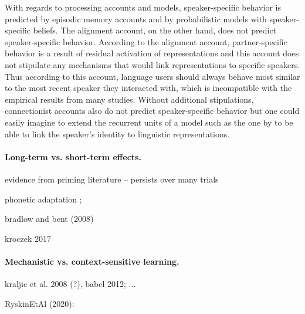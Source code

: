 With regards to processing accounts and models, speaker-specific behavior is predicted by episodic memory accounts and by probabilistic models with speaker-specific beliefs. 
The alignment account, on the other hand, does not predict speaker-specific behavior. According to the alignment account, partner-specific behavior is a result of residual activation of representations
and this account does not stipulate any mechanisms that would link representations to specific speakers. Thus according to this account, language users should always behave most similar to 
the most recent speaker they interacted with, which is incompatible with the empirical results from many studies. Without additional stipulations, connectionist accounts also do not 
predict speaker-specific behavior but one could easily imagine to extend the recurrent units of a model such as the one by \cite{Cheng2006} to be able to link the speaker's identity to
linguistic representations.

\paragraph{Long-term vs. short-term effects.} 

evidence from priming literature -- persists over many trials

phonetic adaptation \cite{XieEarleMyers2019}; 

bradlow and bent (2008)

kroczek 2017

\paragraph{Mechanistic vs. context-sensitive learning.}

kraljic et al. 2008 (?), babel 2012; ...


RyskinEtAl (2020): 


